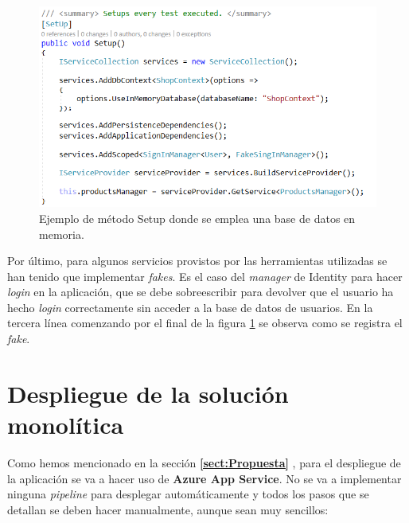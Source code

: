 \documentclass[11pt,spanish,listoffigures]{tfgetsinf}
\begin{document}
\begin{figure}[h]
\centering
\includegraphics[scale=0.8]{SetupTest}
\caption{Ejemplo de método Setup donde se emplea una base de datos en memoria.}
\label{fig:SetupTest}
\end{figure}

Por último, para algunos servicios provistos por las herramientas utilizadas se han tenido que implementar \textit{fakes}. Es el caso del \textit{manager} de Identity para hacer \textit{login} en la aplicación, que se debe sobreescribir para devolver que el usuario ha hecho \textit{login} correctamente sin acceder a la base de datos de usuarios. En la tercera línea comenzando por el final de la figura \ref{fig:SetupTest} se observa como se registra el \textit{fake}.

\section{Despliegue de la solución monolítica}

Como hemos mencionado en la sección \textbf{\ref{sect:Propuesta} }, para el despliegue de la aplicación se va a hacer uso de \textbf{Azure App Service}. No se va a implementar ninguna \textit{pipeline} para desplegar automáticamente y todos los pasos que se detallan se deben hacer manualmente, aunque sean muy sencillos:
\end{document}
